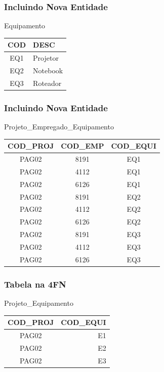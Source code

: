 \documentclass{beamer}
\begin{document}
\begin{frame}
\frametitle{Incluindo Nova Entidade}

\begin{exampleblock}{Equipamento}
	\centering
	\begin{tabular}{| c | l | }
		\hline
		COD & DESC \\\hline
		EQ1 & Projetor \\\hline
		EQ2 & Notebook \\\hline
		EQ3 & Roteador \\\hline
	\end{tabular}
\end{exampleblock}	
\end{frame}

\begin{frame}
\frametitle{Incluindo Nova Entidade}

\begin{exampleblock}{Projeto\_Empregado\_Equipamento}
	\centering
	\begin{tabular}{| c | c | c | }
		\hline
COD\_PROJ & COD\_EMP & COD\_EQUI \\\hline
PAG02 & 8191 & EQ1 \\\hline
PAG02 & 4112 & EQ1 \\\hline
PAG02 & 6126 & EQ1 \\\hline
PAG02 & 8191 & EQ2 \\\hline
PAG02 & 4112 & EQ2 \\\hline
PAG02 & 6126 & EQ2 \\\hline
PAG02 & 8191 & EQ3 \\\hline
PAG02 & 4112 & EQ3 \\\hline
PAG02 & 6126 & EQ3 \\\hline
\end{tabular}
\end{exampleblock}	
\end{frame}

\begin{frame}
\frametitle{Tabela na 4FN}

\begin{exampleblock}{Projeto\_Equipamento}
	\centering
	\begin{tabular}{| c | r |}
		\hline
COD\_PROJ & COD\_EQUI \\\hline
PAG02 & E1 \\\hline
PAG02 & E2 \\\hline
PAG02 & E3 \\\hline
	\end{tabular}
\end{exampleblock}
\end{frame}
\end{document}
